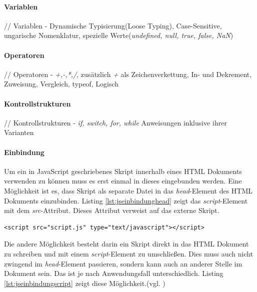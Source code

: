 \documentclass[12pt,a4paper,bibliography=totocnumbered,listof=totocnumbered]{scrartcl}
\begin{document}
\paragraph{Variablen} // Variablen - Dynamische Typisierung(Loose Typing), Case-Sensitive, ungarische Nomenklatur, spezielle Werte(\textit{undefined, null, true, false, NaN})\\

\paragraph{Operatoren} // Operatoren - \textit{+,-,*,/}, zusätzlich \textit{+} als Zeichenverkettung, In- und Dekrement, Zuweisung, Vergleich, typeof, Logisch\\

\paragraph{Kontrollstrukturen} // Kontrollstrukturen - \textit{if, switch, for, while} Anweisungen inklusive ihrer Varianten\\

\paragraph{Einbindung} Um ein in JavaScript geschriebenes Skript innerhalb eines HTML Dokuments verwenden zu können muss es erst einmal in dieses eingebunden werden. Eine Möglichkeit ist es, dass Skript als separate Datei in das \textit{head}-Element des HTML Dokuments einzubinden. Listing \ref{lst:jseinbindunghead} zeigt das \textit{script}-Element mit dem \textit{src}-Attribut. Dieses Attribut verweist auf das externe Skript.

	\vspace{1em}
	\begin{lstlisting}[caption=JavaScript Einbindung als separate Datei im \textit{head}-Element, label=lst:jseinbindunghead]
<script src="script.js" type="text/javascript"></script>
	\end{lstlisting}

Die andere Möglichkeit besteht darin ein Skript direkt in das HTML Dokument zu schreiben und mit einem \textit{script}-Element zu umschließen. Dies muss auch nicht zwingend im \textit{head}-Element passieren, sondern kann auch an anderer Stelle im Dokument sein. Das ist je nach Anwendungsfall unterschiedlich. Listing \ref{lst:jseinbindungscript} zeigt diese Möglichkeit.(vgl. \cite[S.]{})
\end{document}
